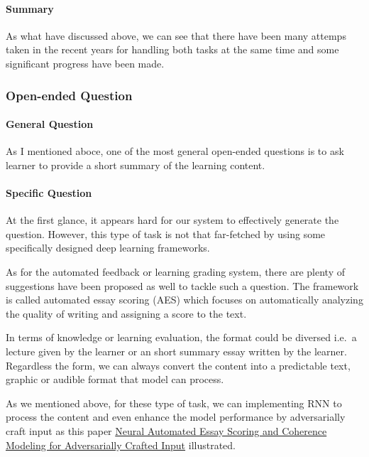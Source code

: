 \documentclass[]{book}
\let\oldparagraph\paragraph
\renewcommand{\paragraph}[1]{\oldparagraph{#1}\mbox{}}
\theoremstyle{definition}
\theoremstyle{definition}
\theoremstyle{definition}
\theoremstyle{remark}
\begin{document}
\paragraph{Summary}\label{summary-2}

As what have discussed above, we can see that there have been many
attemps taken in the recent years for handling both tasks at the same
time and some significant progress have been made.

\subsubsection{Open-ended Question}\label{open-ended-question}

\paragraph{General Question}\label{general-question}

As I mentioned aboce, one of the most general open-ended questions is to
ask learner to provide a short summary of the learning content.

\paragraph{Specific Question}\label{specific-question}

At the first glance, it appears hard for our system to effectively
generate the question. However, this type of task is not that
far-fetched by using some specifically designed deep learning
frameworks.

As for the automated feedback or learning grading system, there are
plenty of suggestions have been proposed as well to tackle such a
question. The framework is called automated essay scoring (AES) which
focuses on automatically analyzing the quality of writing and assigning
a score to the text.

In terms of knowledge or learning evaluation, the format could be
diversed i.e.~a lecture given by the learner or an short summary essay
written by the learner. Regardless the form, we can always convert the
content into a predictable text, graphic or audible format that model
can process.

As we mentioned above, for these type of task, we can implementing RNN
to process the content and even enhance the model performance by
adversarially craft input as this paper
\href{http://aclweb.org/anthology/N18-1024}{Neural Automated Essay
Scoring and Coherence Modeling for Adversarially Crafted Input}
illustrated.
\end{document}
